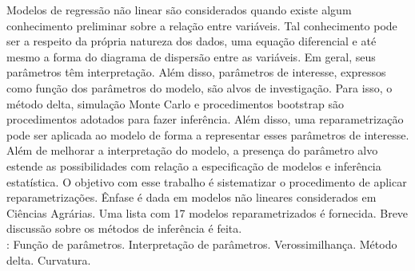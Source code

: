 Modelos de regressão não linear são considerados quando existe algum
conhecimento preliminar sobre a relação entre variáveis. Tal
conhecimento pode ser a respeito da própria natureza dos dados, uma
equação diferencial e até mesmo a forma do diagrama de dispersão entre
as variáveis. Em geral, seus parâmetros têm interpretação. Além disso,
parâmetros de interesse, expressos como função dos parâmetros do
modelo, são alvos de investigação. Para isso, o método delta,
simulação Monte Carlo e procedimentos bootstrap são procedimentos
adotados para fazer inferência. Além disso, uma reparametrização pode
ser aplicada ao modelo de forma a representar esses parâmetros de
interesse. Além de melhorar a interpretação do modelo, a presença do
parâmetro alvo estende as possibilidades com relação a especificação
de modelos e inferência estatística.  O objetivo com esse trabalho é
sistematizar o procedimento de aplicar reparametrizações. Ênfase é
dada em modelos não lineares considerados em Ciências Agrárias. Uma
lista com 17 modelos reparametrizados é fornecida. Breve discussão
sobre os métodos de inferência é feita.\\
\newline
{}: Função de parâmetros. Interpretação de parâmetros. Verossimilhança. Método delta. Curvatura.
